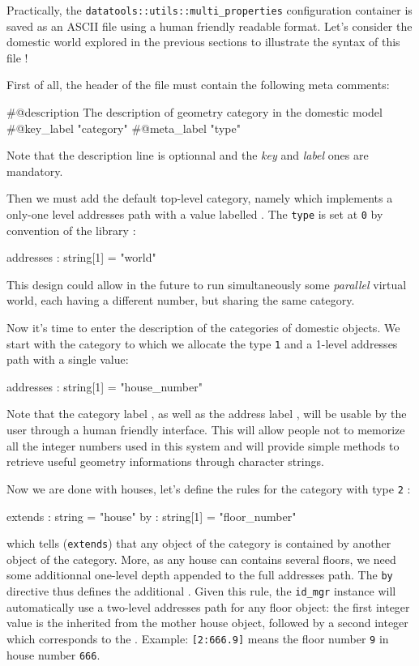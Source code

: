 \pn   Practically,   the  \texttt{datatools::utils::multi\_properties}
configuration  container is  saved as  an ASCII  file using a human
friendly readable format.  Let's  consider the domestic world explored
in the previous sections to illustrate the syntax of this file !

First of all, the header of the file must contain the following
meta comments:

\begin{ShellVerbatim}
#@description The description of geometry category in the domestic model
#@key_label   "category"
#@meta_label  "type"
\end{ShellVerbatim}
\pn Note that the description line is optionnal and the \emph{key} and
\emph{label} ones are mandatory.

Then we must add the default top-level category, namely  which
implements a only-one level addresses path with a value labelled .
The \texttt{type} is set at \texttt{0} by convention of the library :
\begin{ShellVerbatim}
[category="world" type="0"]
addresses : string[1] = "world"
\end{ShellVerbatim}

This design could allow in the future to run simultaneously
some \emph{parallel} virtual world, each having a different 
 number, but sharing the same  category.

Now it's time to enter the description of the categories
of domestic objects.
We start with the  category to which we allocate
the type \texttt{1} and a 1-level addresses path with a single 
 value:
\begin{ShellVerbatim}
[category="house" type="1"]
addresses : string[1] = "house_number"
\end{ShellVerbatim}
Note that the category label , as well as
the address label , will be usable by the user through
a human friendly interface. This will allow people not to memorize
all the integer numbers used in this system and will provide simple methods
to retrieve useful geometry informations through character strings.

Now we are done with houses, let's define the rules for the  category
with type \texttt{2} :
\begin{ShellVerbatim}
[category="floor" type="2"]
extends : string    = "house"
by      : string[1] = "floor_number"
\end{ShellVerbatim}
which tells (\texttt{extends}) that any object of the  category 
is contained by another object of the  category.
More, as any house can contains several floors, we need some additionnal 
one-level depth appended to the full addresses path. The \texttt{by}
directive thus defines the additional .
Given this rule, the \texttt{id\_mgr} instance will
automatically use a two-level addresses path for any floor object:
the first integer value is the    inherited from
the mother house object, followed by
a second integer which corresponds to the .
Example: \verb+[2:666.9]+ means the floor number \texttt{9} 
in house number \texttt{666}.

